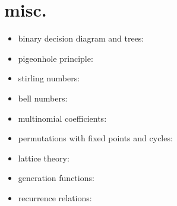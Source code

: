 \documentclass{article}
\begin{document}
\section{misc.}
	\begin{itemize}
		\item binary decision diagram and trees:
		\item pigeonhole principle:
		\item stirling numbers:
		\item bell numbers:
		\item multinomial coefficients:
		\item permutations with fixed points and cycles:
		\item lattice theory:
		\item generation functions:
		\item recurrence relations:
	\end{itemize}
\end{document}
